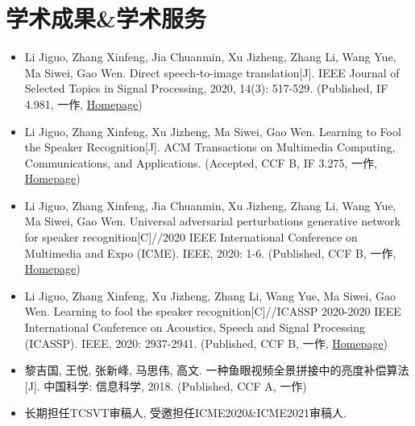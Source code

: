 \documentclass{resume}
\begin{document}

\section{学术成果\&学术服务}
\begin{itemize}
  \item Li Jiguo, Zhang Xinfeng, Jia Chuanmin, Xu Jizheng, Zhang Li, Wang Yue, Ma Siwei, Gao Wen. Direct speech-to-image translation[J]. IEEE Journal of Selected Topics in Signal Processing, 2020, 14(3): 517-529. (Published, IF 4.981, 一作, \href{https://smallflyingpig.github.io/speech-to-image/main}{Homepage})
  \item Li Jiguo, Zhang Xinfeng, Xu Jizheng, Ma Siwei, Gao Wen. Learning to Fool the Speaker Recognition[J]. ACM Transactions on Multimedia Computing, Communications, and Applications. (Accepted, CCF B, IF 3.275, 一作, \href{https://smallflyingpig.github.io/speaker-recognition-attacker/main}{Homepage})
  \item Li Jiguo, Zhang Xinfeng, Jia Chuanmin, Xu Jizheng, Zhang Li, Wang Yue, Ma Siwei, Gao Wen. Universal adversarial perturbations generative network for speaker recognition[C]//2020 IEEE International Conference on Multimedia and Expo (ICME). IEEE, 2020: 1-6. (Published, CCF B, 一作, \href{https://smallflyingpig.github.io/UAPs_for_speaker_recognition/main}{Homepage})
  \item Li Jiguo, Zhang Xinfeng, Xu Jizheng, Zhang Li, Wang Yue, Ma Siwei, Gao Wen. Learning to fool the speaker recognition[C]//ICASSP 2020-2020 IEEE International Conference on Acoustics, Speech and Signal Processing (ICASSP). IEEE, 2020: 2937-2941. (Published, CCF B, 一作, \href{https://smallflyingpig.github.io/speaker-recognition-attacker/main}{Homepage})
  \item 黎吉国, 王悦, 张新峰, 马思伟, 高文. 一种鱼眼视频全景拼接中的亮度补偿算法[J]. 中国科学: 信息科学, 2018. (Published, CCF A, 一作)
  \item 长期担任TCSVT审稿人, 受邀担任ICME2020\&ICME2021审稿人.
\end{itemize}
\end{document}
